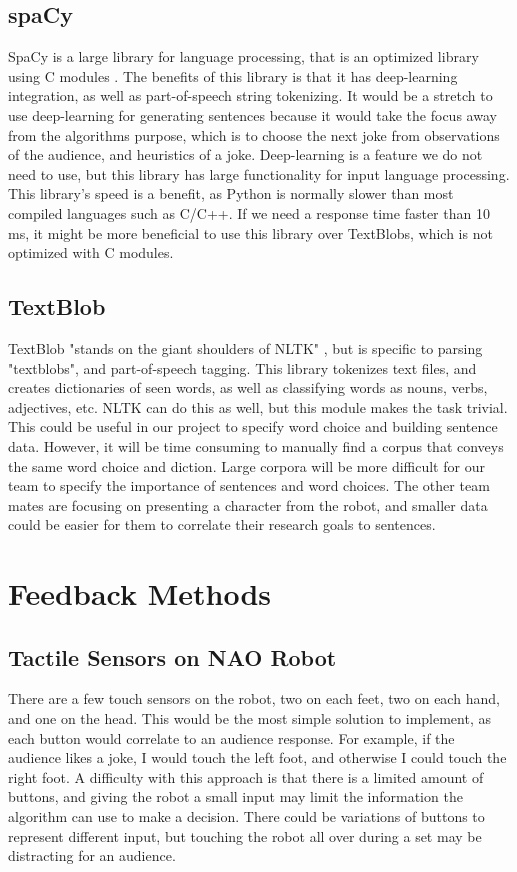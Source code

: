   \subsection{spaCy}

  SpaCy is a large library for language processing, that is an optimized library using C modules \cite{spacy}. The benefits of this library is that it has deep-learning integration, as well as part-of-speech string tokenizing. It would be a stretch to use deep-learning for generating sentences because it would take the focus away from the algorithms purpose, which is to choose the next joke from observations of the audience, and heuristics of a joke. Deep-learning is a feature we do not need to use, but this library has large functionality for input language processing. This library's speed is a benefit, as Python is normally slower than most compiled languages such as C/C++. If we need a response time faster than 10 ms, it might be more beneficial to use this library over TextBlobs, which is not optimized with C modules.
  \subsection{TextBlob}

  TextBlob "stands on the giant shoulders of NLTK" \cite{textblob}, but is specific to parsing "textblobs", and part-of-speech tagging. This library tokenizes text files, and creates dictionaries of seen words, as well as classifying words as nouns, verbs, adjectives, etc. NLTK can do this as well, but this module makes the task trivial. This could be useful in our project to specify word choice and building sentence data. However, it will be time consuming to manually find a corpus that conveys the same word choice and diction. Large corpora will be more difficult for our team to specify the importance of sentences and word choices. The other team mates are focusing on presenting a character from the robot, and smaller data could be easier for them to correlate their research goals to sentences.

\section{Feedback Methods}
  \subsection{Tactile Sensors on NAO Robot}
   There are a few touch sensors on the robot, two on each feet, two on each hand, and one on the head. This would be the most simple solution to implement, as each button would correlate to an audience response. For example, if the audience likes a joke, I would touch the left foot, and otherwise I could touch the right foot. A difficulty with this approach is that there is a limited amount of buttons, and giving the robot a small input may limit the information the algorithm can use to make a decision. There could be variations of buttons to represent different input, but touching the robot all over during a set may be distracting for an audience.

